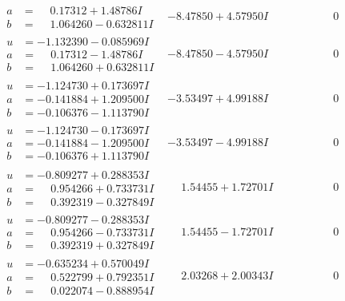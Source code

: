 \documentclass[1p]{elsarticle_modified}
\theoremstyle{definition}
\begin{document}
$$\begin{array}{c|c|c}
\begin{aligned}
a &= \phantom{-}0.17312 + 1.48786 I \\
b &= \phantom{-}1.064260 - 0.632811 I\end{aligned}
 & -8.47850 + 4.57950 I & \phantom{-0.000000 } 0 \\ \hline\begin{aligned}
u &= -1.132390 - 0.085969 I \\
a &= \phantom{-}0.17312 - 1.48786 I \\
b &= \phantom{-}1.064260 + 0.632811 I\end{aligned}
 & -8.47850 - 4.57950 I & \phantom{-0.000000 } 0 \\ \hline\begin{aligned}
u &= -1.124730 + 0.173697 I \\
a &= -0.141884 + 1.209500 I \\
b &= -0.106376 - 1.113790 I\end{aligned}
 & -3.53497 + 4.99188 I & \phantom{-0.000000 } 0 \\ \hline\begin{aligned}
u &= -1.124730 - 0.173697 I \\
a &= -0.141884 - 1.209500 I \\
b &= -0.106376 + 1.113790 I\end{aligned}
 & -3.53497 - 4.99188 I & \phantom{-0.000000 } 0 \\ \hline\begin{aligned}
u &= -0.809277 + 0.288353 I \\
a &= \phantom{-}0.954266 + 0.733731 I \\
b &= \phantom{-}0.392319 - 0.327849 I\end{aligned}
 & \phantom{-}1.54455 + 1.72701 I & \phantom{-0.000000 } 0 \\ \hline\begin{aligned}
u &= -0.809277 - 0.288353 I \\
a &= \phantom{-}0.954266 - 0.733731 I \\
b &= \phantom{-}0.392319 + 0.327849 I\end{aligned}
 & \phantom{-}1.54455 - 1.72701 I & \phantom{-0.000000 } 0 \\ \hline\begin{aligned}
u &= -0.635234 + 0.570049 I \\
a &= \phantom{-}0.522799 + 0.792351 I \\
b &= \phantom{-}0.022074 - 0.888954 I\end{aligned}
 & \phantom{-}2.03268 + 2.00343 I & \phantom{-0.000000 } 0 \\ \hline\begin{aligned}

\end{aligned}
\end{array}$$
\end{document}
